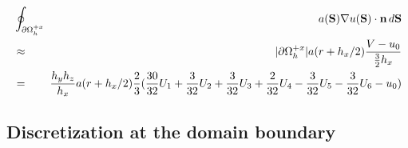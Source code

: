 \documentclass[10pt]{article}
\begin{document}
\begin{minipage}{1.75in}
\end{minipage} \ \ \ \ 
\begin{minipage}{4.00in}
\begin{eqnarray*}
 & \oint_{\partial\Omega_h^{+x}} \!\!\! & a(\textbf{S}) \nabla u(\textbf{S})\cdot \textbf{n} \, d\textbf{S}  \\
 & \approx & |\partial\Omega_h^{+x}| a(r+h_x/2) \frac{V - u_0}{\frac{3}{2}h_x} \\
& = & \frac{h_yh_z}{h_x}  a(r+h_x/2) \frac{2}{3} (\frac{30}{32} U_1 + \frac{3}{32} U_2 + \frac{3}{32} U_3 + \frac{2}{32}U_4 - \frac{3}{32}U_5 - \frac{3}{32}U_6 - u_0)   \\
\end{eqnarray*}
\end{minipage}


\subsection{Discretization at the domain boundary} \label{ss:discret-boundary}



\end{document}
